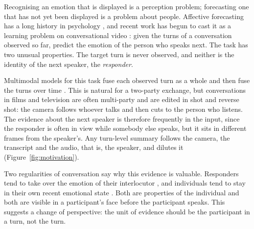 \documentclass[11pt]{article}
\begin{document}
Recognising an emotion that is displayed is a perception problem; forecasting one that has not yet been displayed is
a problem about people. Affective forecasting has a long history in psychology \citep{wilson2003affective}, and
recent work has begun to cast it as a learning problem on conversational video \citep{wang2026hief}: given the turns
of a conversation observed so far, predict the emotion of the person who speaks next. The task has two unusual
properties. The target turn is never observed, and neither is the identity of the next speaker, the
\emph{responder}.



Multimodal models for this task fuse each observed turn as a whole and then fuse the turns over time
\citep{wang2026hief}. This is natural for a two-party exchange, but conversations in films and television are often
multi-party and are edited in shot and reverse shot: the camera follows whoever talks and then cuts to the person who
listens. The evidence about the next speaker is therefore frequently in the input, since the responder is often in view
while somebody else speaks, but it sits in different frames from the speaker's. Any turn-level summary follows the
camera, the transcript and the audio, that is, the speaker, and dilutes it (Figure~\ref{fig:motivation}).

Two regularities of conversation say why this evidence is valuable. Responders tend to take over the emotion of
their interlocutor \citep[emotional contagion;][]{hatfield1994contagion}, and individuals tend to stay in their own
recent emotional state \citep[emotional inertia;][]{kuppens2010inertia}. Both are properties of the individual and
both are visible in a participant's face before the participant speaks. This suggests a change of perspective: the unit
of evidence should be the participant in a turn, not the turn.
\end{document}
